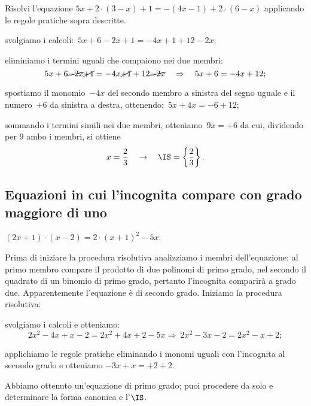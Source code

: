\begin{exrig}
\begin{esempio}
 Risolvi l'equazione $5x+2\cdot (3-x)+1=-(4x-1)+2\cdot (6-x)$ applicando le regole pratiche sopra descritte.
\begin{enumeratea}
 \item svolgiamo i calcoli:~$5x+6-2x+1=-4x+1+12-2x$;
 \item eliminiamo i termini uguali che compaiono nei due membri:
 \[5x+6 \cancel{-2x}\cancel{+1}=-4x \cancel{+1}+12\cancel{-2x}\quad\Rightarrow\quad 5x+6=-4x+12;\]
 \item spostiamo il monomio~$-4x$ del secondo membro a sinistra del segno uguale e il numero~$+6$
da sinistra a destra, ottenendo:~$5x+4x=-6+12$;
\item sommando i termini simili nei due membri, otteniamo~$9x=+6$ da cui, dividendo per 9
 ambo i membri, si ottiene
 \[x=\dfrac{2}{3}\quad\to\quad \IS =\left\{\dfrac{2}{3}\right\}.\]
 \end{enumeratea}
\end{esempio}

\ovalbox{\risolvii \ref{ese:15.2}, \ref{ese:15.3}, \ref{ese:15.4}, \ref{ese:15.5}, \ref{ese:15.6}, \ref{ese:15.7}, \ref{ese:15.8}, \ref{ese:15.9}, \ref{ese:15.10}, \ref{ese:15.11}, \ref{ese:15.12}, \ref{ese:15.13},}

\vspace{1.10ex}
\ovalbox{\ref{ese:15.14}, \ref{ese:15.15}}

\subsection{Equazioni in cui l'incognita compare con grado maggiore di uno}
 \begin{esempio}

$(2x+1)\cdot (x-2)=2\cdot (x+1)^{2}-5x$.

Prima di iniziare la procedura risolutiva analizziamo i membri
dell'equazione: al primo membro compare il prodotto
di due polinomi di primo grado, nel secondo il quadrato di un binomio
di primo grado, pertanto l'incognita comparirà a grado due. Apparentemente
l'equazione è di secondo grado. Iniziamo la procedura
risolutiva:
\begin{enumeratea}
\item svolgiamo i calcoli e otteniamo:
\[2x^{2}-4x+x-2=2x^{2}+4x+2-5x\Rightarrow~2x^{2}-3x-2=2x^{2}-x+2;\]
\item applichiamo le regole pratiche eliminando i monomi
uguali con l'incognita al secondo grado e otteniamo
$-3x+x=+2+2$.
\end{enumeratea}

Abbiamo ottenuto un'equazione di primo grado; puoi
procedere da solo e determinare la forma canonica e l'$\IS$.

 \end{esempio}
\end{exrig}

